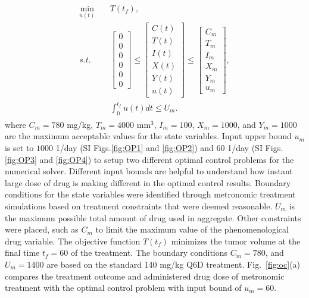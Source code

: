 \begin{align}  \label{eq:ocp}
	\begin{split}
		\min_{u(t)} & \quad T(t_f), \\
		s.t. & \quad 
		\begin{bmatrix}
			0 \\ 0 \\ 0 \\ 0 \\ 0 \\ 0
		\end{bmatrix} 
		\leq
		\begin{bmatrix}
			C(t) \\ T(t) \\ I(t) \\ X(t) \\ Y(t) \\ u(t)
		\end{bmatrix}
		\leq
		\begin{bmatrix}
			C_m \\ T_m \\ I_m \\ X_m \\ Y_m \\ u_m
		\end{bmatrix},
		\\
		& \quad \int_0^{t_f} u(t) dt \leq U_m.
	\end{split}
\end{align}
%
where $C_m=780$ mg/kg, $T_m=4000$ mm$^3$, $I_m=100$, $X_m=1000$, and $Y_m=1000$ are the maximum acceptable values for the state variables. Input upper bound $u_m$ is set to $1000$ 1/day (SI Figs.\ref{fig:OP1} and \ref{fig:OP2}) and $60$ 1/day (SI Figs. \ref{fig:OP3} and \ref{fig:OP4}) to setup two different optimal control problems for the numerical solver. Different input bounds are helpful to understand how instant large dose of drug is making different in the optimal control results. Boundary conditions for the state variables were identified through metronomic treatment simulations based on treatment constraints that were deemed reasonable. $U_m$ is the maximum possible total amount of drug used in aggregate. Other constraints were placed, such as $C_m$ to limit the maximum value of the phenomenological drug variable. The objective function $T(t_f)$ minimizes the tumor volume at the final time $t_f=60$ of the treatment. The boundary conditions $C_m=780$, and $U_m=1400$ are based on the standard 140 mg/kg Q6D treatment. Fig.~\ref{fig:oc}(a) compares the treatment outcome and administered drug dose of metronomic treatment with the optimal control problem with input bound of $u_m=60$.
